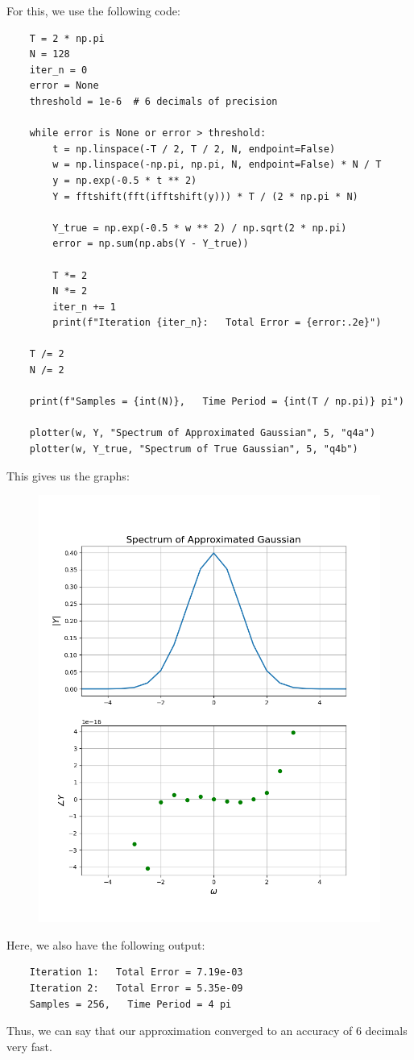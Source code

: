 \documentclass[12pt, a4paper]{article}
\begin{document}
For this, we use the following code:
\begin{lstlisting}
    T = 2 * np.pi
    N = 128
    iter_n = 0
    error = None
    threshold = 1e-6  # 6 decimals of precision

    while error is None or error > threshold:
        t = np.linspace(-T / 2, T / 2, N, endpoint=False)
        w = np.linspace(-np.pi, np.pi, N, endpoint=False) * N / T
        y = np.exp(-0.5 * t ** 2)
        Y = fftshift(fft(ifftshift(y))) * T / (2 * np.pi * N)

        Y_true = np.exp(-0.5 * w ** 2) / np.sqrt(2 * np.pi)
        error = np.sum(np.abs(Y - Y_true))

        T *= 2
        N *= 2
        iter_n += 1
        print(f"Iteration {iter_n}:   Total Error = {error:.2e}")

    T /= 2
    N /= 2

    print(f"Samples = {int(N)},   Time Period = {int(T / np.pi)} pi")

    plotter(w, Y, "Spectrum of Approximated Gaussian", 5, "q4a")
    plotter(w, Y_true, "Spectrum of True Gaussian", 5, "q4b")
\end{lstlisting}
This gives us the graphs:
\begin{figure}[H]
    \centering
    \includegraphics[scale=0.6]{q4a.png}
\end{figure}
Here, we also have the following output:
\begin{lstlisting}
    Iteration 1:   Total Error = 7.19e-03
    Iteration 2:   Total Error = 5.35e-09
    Samples = 256,   Time Period = 4 pi
\end{lstlisting}
Thus, we can say that our approximation converged to an accuracy of 6 decimals very fast.
\pagebreak
\end{document}
